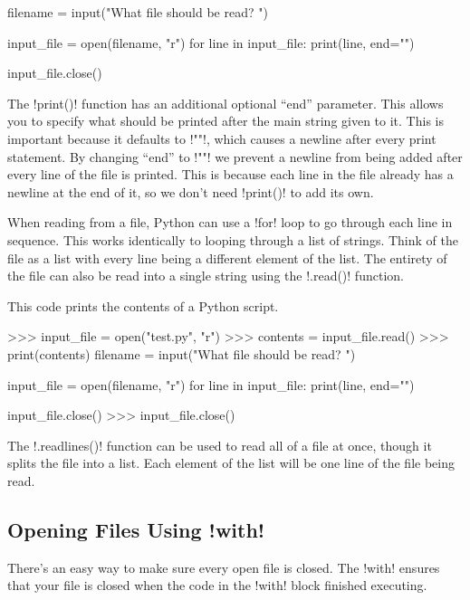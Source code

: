 \documentclass[11pt]{cselabheader}
\begin{document}
\begin{python3code}
filename = input("What file should be read? ")

input_file = open(filename, "r")
for line in input_file:
    print(line, end="")

input_file.close()
\end{python3code}

The \pythoninline!print()! function has an additional optional ``end''
parameter. This allows you to specify what should be printed after the main
string given to it. This is important because it defaults to
\pythoninline!"\n"!, which causes a newline after every print statement. By
changing ``end'' to \pythoninline!""! we prevent a newline from being added
after every line of the file is printed. This is because each line in the
file already has a newline at the end of it, so we don't need
\pythoninline!print()! to add its own.

When reading from a file, Python can use a \pythoninline!for! loop to go
through each line in sequence. This works identically to looping through a list
of strings. Think of the file as a list with every line being a different
element of the list. The entirety of the file can also be read into a single
string using the \pythoninline!.read()! function.


This code prints the contents of a Python script.

\begin{pyconcode}
>>> input_file = open("test.py", "r")
>>> contents = input_file.read()
>>> print(contents)
filename = input("What file should be read? ")

input_file = open(filename, "r")
for line in input_file:
    print(line, end="")

input_file.close()
>>> input_file.close()
\end{pyconcode}

The \pythoninline!.readlines()! function can be used to read all of a file at
once, though it splits the file into a list. Each element of the list will be
one line of the file being read.

\subsection{Opening Files Using \protect\pythoninline!with!}
\label{sec:with}

There's an easy way to make sure every open file is closed. The
\pythoninline!with! ensures that your file is closed when the code in the
\pythoninline!with! block finished executing.
\end{document}
